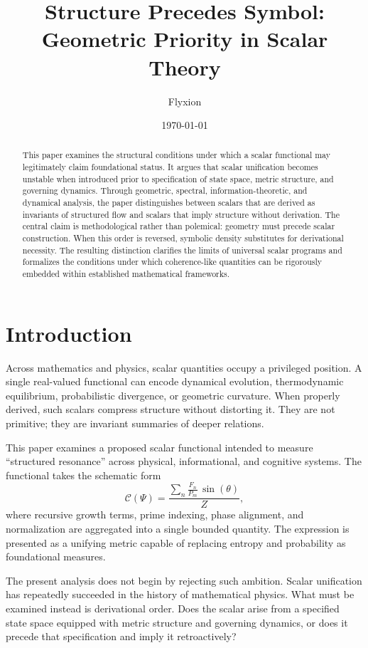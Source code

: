 \documentclass[12pt]{article}
\title{\textbf{Structure Precedes Symbol:\\
Geometric Priority in Scalar Theory}}
\author{Flyxion}
\date{\today}
\begin{document}
\maketitle
\thispagestyle{empty}
\begin{abstract}
\noindent
This paper examines the structural conditions under which a scalar functional may legitimately claim foundational status. It argues that scalar unification becomes unstable when introduced prior to specification of state space, metric structure, and governing dynamics. Through geometric, spectral, information-theoretic, and dynamical analysis, the paper distinguishes between scalars that are derived as invariants of structured flow and scalars that imply structure without derivation. The central claim is methodological rather than polemical: geometry must precede scalar construction. When this order is reversed, symbolic density substitutes for derivational necessity. The resulting distinction clarifies the limits of universal scalar programs and formalizes the conditions under which coherence-like quantities can be rigorously embedded within established mathematical frameworks.
\end{abstract}

\newpage
\section{Introduction}

Across mathematics and physics, scalar quantities occupy a privileged position. A single real-valued functional can encode dynamical evolution, thermodynamic equilibrium, probabilistic divergence, or geometric curvature. When properly derived, such scalars compress structure without distorting it. They are not primitive; they are invariant summaries of deeper relations.

This paper examines a proposed scalar functional intended to measure ``structured resonance'' across physical, informational, and cognitive systems. The functional takes the schematic form
\[
\mathcal{C}(\Psi)
=
\frac{\displaystyle\sum_n \frac{F_n}{P_m}\,\sin(\theta)}{Z},
\]
where recursive growth terms, prime indexing, phase alignment, and normalization are aggregated into a single bounded quantity. The expression is presented as a unifying metric capable of replacing entropy and probability as foundational measures.

The present analysis does not begin by rejecting such ambition. Scalar unification has repeatedly succeeded in the history of mathematical physics. What must be examined instead is derivational order. Does the scalar arise from a specified state space equipped with metric structure and governing dynamics, or does it precede that specification and imply it retroactively?
\end{document}
